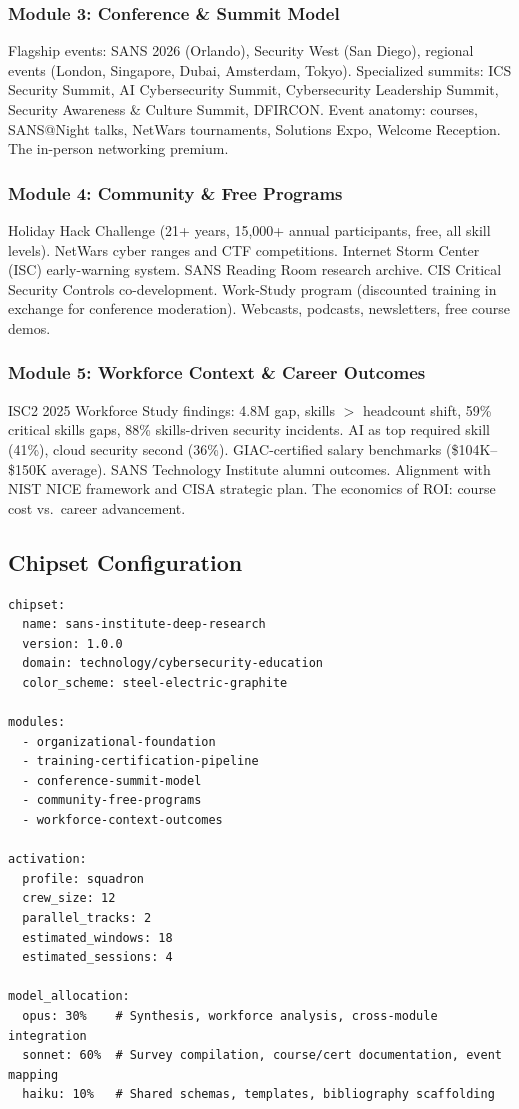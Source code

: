 \documentclass[11pt,letterpaper]{article}
\begin{document}
\subsubsection{Module 3: Conference \& Summit Model}
Flagship events: SANS 2026 (Orlando), Security West (San Diego), regional events (London, Singapore, Dubai, Amsterdam, Tokyo). Specialized summits: ICS Security Summit, AI Cybersecurity Summit, Cybersecurity Leadership Summit, Security Awareness \& Culture Summit, DFIRCON. Event anatomy: courses, SANS@Night talks, NetWars tournaments, Solutions Expo, Welcome Reception. The in-person networking premium.

\subsubsection{Module 4: Community \& Free Programs}
Holiday Hack Challenge (21+ years, 15,000+ annual participants, free, all skill levels). NetWars cyber ranges and CTF competitions. Internet Storm Center (ISC) early-warning system. SANS Reading Room research archive. CIS Critical Security Controls co-development. Work-Study program (discounted training in exchange for conference moderation). Webcasts, podcasts, newsletters, free course demos.

\subsubsection{Module 5: Workforce Context \& Career Outcomes}
ISC2 2025 Workforce Study findings: 4.8M gap, skills $>$ headcount shift, 59\% critical skills gaps, 88\% skills-driven security incidents. AI as top required skill (41\%), cloud security second (36\%). GIAC-certified salary benchmarks (\$104K--\$150K average). SANS Technology Institute alumni outcomes. Alignment with NIST NICE framework and CISA strategic plan. The economics of ROI: course cost vs.\ career advancement.

\subsection{Chipset Configuration}

\begin{asciibox}
\begin{verbatim}
chipset:
  name: sans-institute-deep-research
  version: 1.0.0
  domain: technology/cybersecurity-education
  color_scheme: steel-electric-graphite

modules:
  - organizational-foundation
  - training-certification-pipeline
  - conference-summit-model
  - community-free-programs
  - workforce-context-outcomes

activation:
  profile: squadron
  crew_size: 12
  parallel_tracks: 2
  estimated_windows: 18
  estimated_sessions: 4

model_allocation:
  opus: 30%    # Synthesis, workforce analysis, cross-module integration
  sonnet: 60%  # Survey compilation, course/cert documentation, event mapping
  haiku: 10%   # Shared schemas, templates, bibliography scaffolding
\end{verbatim}
\end{asciibox}
\end{document}
